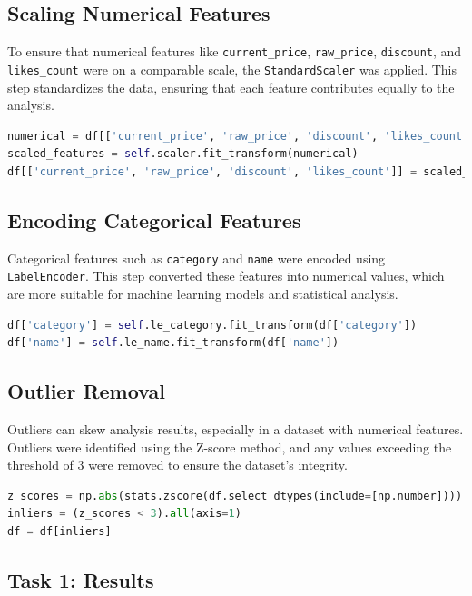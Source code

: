 \documentclass[a4paper,11pt]{article}
\begin{document}
\subsection{Scaling Numerical Features}

To ensure that numerical features like \texttt{current\_price}, \texttt{raw\_price}, \texttt{discount}, and \texttt{likes\_count} were on a comparable scale, the \texttt{StandardScaler} was applied. This step standardizes the data, ensuring that each feature contributes equally to the analysis.

\begin{lstlisting}[language=Python]
numerical = df[['current_price', 'raw_price', 'discount', 'likes_count']]
scaled_features = self.scaler.fit_transform(numerical)
df[['current_price', 'raw_price', 'discount', 'likes_count']] = scaled_features
\end{lstlisting}

\subsection{Encoding Categorical Features}

Categorical features such as \texttt{category} and \texttt{name} were encoded using \texttt{LabelEncoder}. This step converted these features into numerical values, which are more suitable for machine learning models and statistical analysis.

\begin{lstlisting}[language=Python]
df['category'] = self.le_category.fit_transform(df['category'])
df['name'] = self.le_name.fit_transform(df['name'])
\end{lstlisting}

\subsection{Outlier Removal}

Outliers can skew analysis results, especially in a dataset with numerical features. Outliers were identified using the Z-score method, and any values exceeding the threshold of 3 were removed to ensure the dataset's integrity.

\begin{lstlisting}[language=Python]
z_scores = np.abs(stats.zscore(df.select_dtypes(include=[np.number])))
inliers = (z_scores < 3).all(axis=1)
df = df[inliers]
\end{lstlisting}

\subsection{Task 1: Results}
\end{document}
